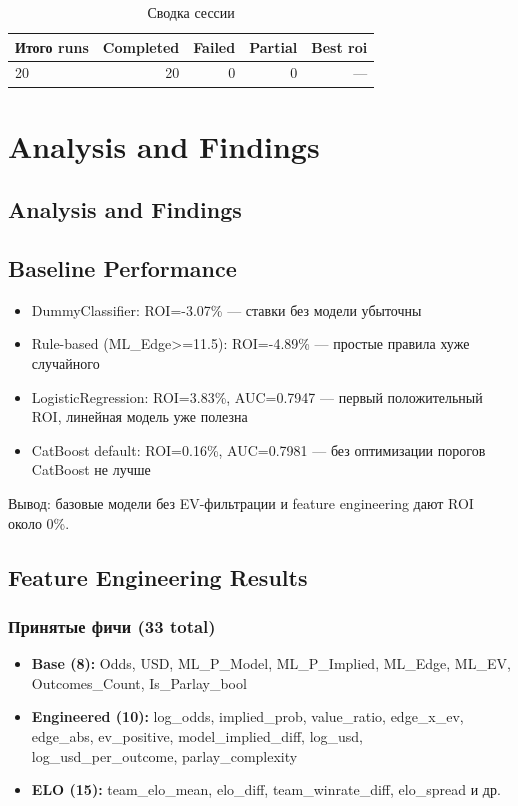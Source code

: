 \documentclass[12pt,a4paper]{article}
\begin{document}
\begin{table}[H]
\centering
\caption{Сводка сессии}
\begin{tabular}{lrrrr}
\toprule
Итого runs & Completed & Failed & Partial & Best roi \\
\midrule
20 & \textcolor{passcolor}{20}
    & \textcolor{failcolor}{0}
    & \textcolor{partialcolor}{0}
    & --- \\
\bottomrule
\end{tabular}
\end{table}







\section{Analysis and Findings}

\subsection{Analysis and Findings}

\subsection{Baseline Performance}
\begin{itemize}
  \item DummyClassifier: ROI=-3.07\% — ставки без модели убыточны
  \item Rule-based (ML\_Edge>=11.5): ROI=-4.89\% — простые правила хуже случайного
  \item LogisticRegression: ROI=3.83\%, AUC=0.7947 — первый положительный ROI, линейная модель уже полезна
  \item CatBoost default: ROI=0.16\%, AUC=0.7981 — без оптимизации порогов CatBoost не лучше
\end{itemize}

Вывод: базовые модели без EV-фильтрации и feature engineering дают ROI около 0\%.

\subsection{Feature Engineering Results}

\subsubsection{Принятые фичи (33 total)}
\begin{itemize}
  \item \textbf{Base (8):} Odds, USD, ML\_P\_Model, ML\_P\_Implied, ML\_Edge, ML\_EV, Outcomes\_Count, Is\_Parlay\_bool
  \item \textbf{Engineered (10):} log\_odds, implied\_prob, value\_ratio, edge\_x\_ev, edge\_abs, ev\_positive, model\_implied\_diff, log\_usd, log\_usd\_per\_outcome, parlay\_complexity
  \item \textbf{ELO (15):} team\_elo\_mean, elo\_diff, team\_winrate\_diff, elo\_spread и др.
\end{itemize}
\end{document}
